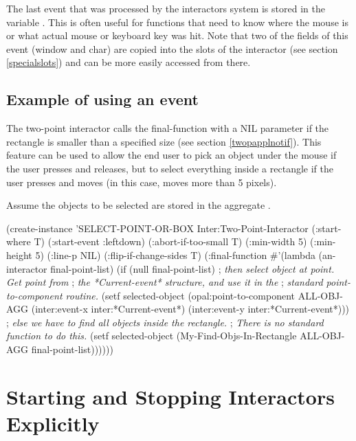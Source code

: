 The last event that was processed by the interactors system is stored in
the variable .  This is often useful for
functions that need to know where the mouse is or what actual mouse or
keyboard key was hit.  Note that two of the fields of this event (window and
char) are copied into the slots of the interactor (see section
\ref{specialslots}) and can be more easily accessed from there.

\subsection{Example of using an event}
\label{twopselectexample}
The two-point interactor calls the final-function with a NIL parameter if
the rectangle is smaller than a specified size (see section
\ref{twopapplnotif}).  This feature can be used to allow the end user to
pick an object under the mouse if the user presses and releases, but to
select everything inside a rectangle if the user presses and moves (in this
case, moves more than 5 pixels).

Assume the objects to be selected are stored in the aggregate .
\begin{programexample}
(create-instance 'SELECT-POINT-OR-BOX Inter:Two-Point-Interactor
  (:start-where T)
  (:start-event :leftdown)
  (:abort-if-too-small T)
  (:min-width 5)
  (:min-height 5)
  (:line-p NIL)
  (:flip-if-change-sides T)
  (:final-function
   \#'(lambda (an-interactor final-point-list)
       (if (null final-point-list)
	   ; {\it then select object at point.  Get point from}
	   ; {\it  the *Current-event* structure, and use it in the}
	   ; {\it  standard point-to-component routine.}
	   (setf selected-object
		 (opal:point-to-component ALL-OBJ-AGG
					  (inter:event-x inter:*Current-event*)
					  (inter:event-y inter:*Current-event*)))
	   ; {\it else we have to find all objects inside the rectangle.}
	   ; {\it  There is no standard function to do this.}
	   (setf selected-object
		 (My-Find-Objs-In-Rectangle ALL-OBJ-AGG final-point-list))))))
\end{programexample}


\section{Starting and Stopping Interactors Explicitly}
\label{startinteractor}

